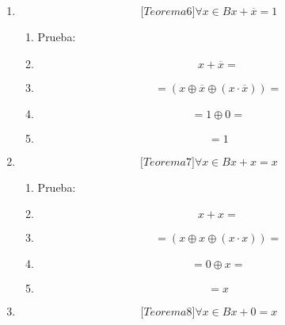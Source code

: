 \begin{enumerate}
\begin{enumerate}
\begin{enumerate}
\begin{enumerate}
        \begin{enumerate}
        \def\labelenumv{\arabic{enumv}.}
        \tightlist
        \item
          Prueba:
        \item
          \[x \oplus {\overline{x} =}\]
        \item
          \[{= {x \oplus \left( {x \oplus 1} \right)}} =\]
        \item
          \[{= \left( {x \oplus x} \right)} \oplus {1 =}\]
        \item
          \[{= {0 \oplus 1}} =\]
        \item
          \[= 1\]
        \end{enumerate}
      \item
        \[{\lbrack{{Teorema}6}\rbrack}\forall{x \in B}{{x + \overline{x}} = 1}\]

        \begin{enumerate}
        \def\labelenumv{\arabic{enumv}.}
        \tightlist
        \item
          Prueba:
        \item
          \[{x + \overline{x}} =\]
        \item
          \[{= \left( {x \oplus \overline{x} \oplus \left( {x \cdot \overline{x}} \right)} \right)} =\]
        \item
          \[{= {1 \oplus 0}} =\]
        \item
          \[= 1\]
        \end{enumerate}
      \item
        \[{\lbrack{{Teorema}7}\rbrack}\forall{x \in B}{{x + x} = x}\]

        \begin{enumerate}
        \def\labelenumv{\arabic{enumv}.}
        \tightlist
        \item
          Prueba:
        \item
          \[{x + x} =\]
        \item
          \[{= \left( {x \oplus x \oplus \left( {x \cdot x} \right)} \right)} =\]
        \item
          \[{= {0 \oplus x}} =\]
        \item
          \[= x\]
        \end{enumerate}
      \item
        \[{\lbrack{{Teorema}8}\rbrack}\forall{x \in B}{{x + 0} = x}\]


\end{enumerate}
\end{enumerate}
\end{enumerate}
\end{enumerate}
